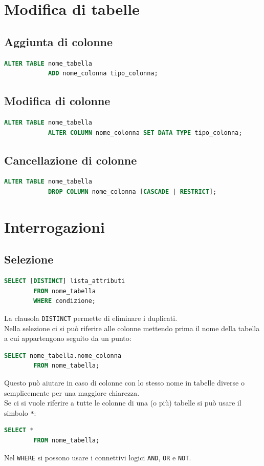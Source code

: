 \documentclass[12pt, a4paper]{report}
\begin{document}
    \section{Modifica di tabelle}
    \subsection{Aggiunta di colonne}
    \begin{lstlisting}[language=SQL]
        ALTER TABLE nome_tabella
            ADD nome_colonna tipo_colonna;
    \end{lstlisting}
    \subsection{Modifica di colonne}
    \begin{lstlisting}[language=SQL]
        ALTER TABLE nome_tabella
            ALTER COLUMN nome_colonna SET DATA TYPE tipo_colonna;
    \end{lstlisting}
    \subsection{Cancellazione di colonne}
    \begin{lstlisting}[language=SQL]
        ALTER TABLE nome_tabella
            DROP COLUMN nome_colonna [CASCADE | RESTRICT];
    \end{lstlisting}
    \section{Interrogazioni}
    \subsection{Selezione}
    \begin{lstlisting}[language=SQL]
        SELECT [DISTINCT] lista_attributi
        FROM nome_tabella
        WHERE condizione;
    \end{lstlisting}
    La clausola \texttt{DISTINCT} permette di eliminare i duplicati.\\
    Nella selezione ci si può riferire alle colonne mettendo prima il nome della tabella a cui appartengono seguito da un punto:
    \begin{lstlisting}[language=SQL]
        SELECT nome_tabella.nome_colonna
        FROM nome_tabella;
    \end{lstlisting}
    Questo può aiutare in caso di colonne con lo stesso nome in tabelle diverse o semplicemente per una maggiore chiarezza.\\
    Se ci si vuole riferire a tutte le colonne di una (o più) tabelle si può usare il simbolo \texttt{*}:
    \begin{lstlisting}[language=SQL]
        SELECT *
        FROM nome_tabella;
    \end{lstlisting}
    Nel \texttt{WHERE} si possono usare i connettivi logici \texttt{AND}, \texttt{OR} e \texttt{NOT}.
\end{document}
